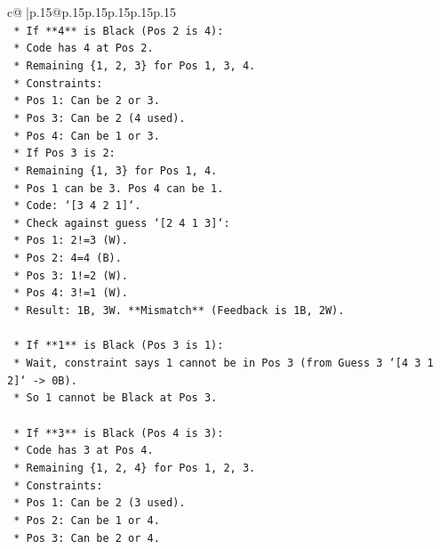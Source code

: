 \documentclass{article}
\begin{document}
{\begin{supertabular}{c@{$\;$}|p{.15\linewidth}@{}p{.15\linewidth}p{.15\linewidth}p{.15\linewidth}p{.15\linewidth}p{.15\linewidth}}
{{{\\ 
\texttt{    *   If **4** is Black (Pos 2 is 4):} \\
\texttt{        *   Code has 4 at Pos 2.} \\
\texttt{        *   Remaining \{1, 2, 3\} for Pos 1, 3, 4.} \\
\texttt{        *   Constraints:} \\
\texttt{            *   Pos 1: Can be 2 or 3.} \\
\texttt{            *   Pos 3: Can be 2 (4 used).} \\
\texttt{            *   Pos 4: Can be 1 or 3.} \\
\texttt{        *   If Pos 3 is 2:} \\
\texttt{            *   Remaining \{1, 3\} for Pos 1, 4.} \\
\texttt{            *   Pos 1 can be 3. Pos 4 can be 1.} \\
\texttt{            *   Code: `{[}3 4 2 1{]}`.} \\
\texttt{            *   Check against guess `{[}2 4 1 3{]}`:} \\
\texttt{                *   Pos 1: 2!=3 (W).} \\
\texttt{                *   Pos 2: 4=4 (B).} \\
\texttt{                *   Pos 3: 1!=2 (W).} \\
\texttt{                *   Pos 4: 3!=1 (W).} \\
\texttt{                *   Result: 1B, 3W. **Mismatch** (Feedback is 1B, 2W).} \\
\\ 
\texttt{    *   If **1** is Black (Pos 3 is 1):} \\
\texttt{        *   Wait, constraint says 1 cannot be in Pos 3 (from Guess 3 `{[}4 3 1 2{]}` {-}> 0B).} \\
\texttt{        *   So 1 cannot be Black at Pos 3.} \\
\\ 
\texttt{    *   If **3** is Black (Pos 4 is 3):} \\
\texttt{        *   Code has 3 at Pos 4.} \\
\texttt{        *   Remaining \{1, 2, 4\} for Pos 1, 2, 3.} \\
\texttt{        *   Constraints:} \\
\texttt{            *   Pos 1: Can be 2 (3 used).} \\
\texttt{            *   Pos 2: Can be 1 or 4.} \\
\texttt{            *   Pos 3: Can be 2 or 4.} \\
}}}
\end{supertabular}}
\end{document}
